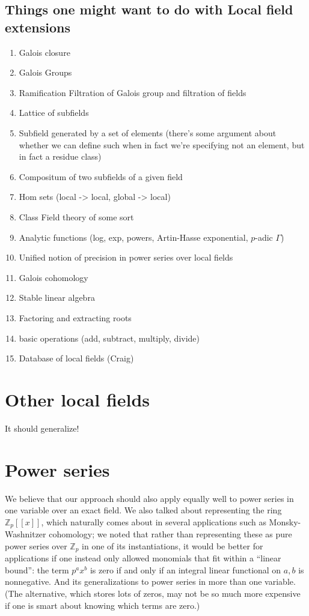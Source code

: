 \documentclass[12pt]{amsart}
\newcommand{\Z}{\mathbb Z}
\begin{document}
\subsection{Things one might want to do with Local field extensions}
\begin{enumerate}
\item Galois closure
\item Galois Groups
\item Ramification Filtration of Galois group and filtration of fields
\item Lattice of subfields
\item Subfield generated by a set of elements (there's some argument about whether we can define such when in fact we're specifying not an element, but in fact a residue class)
\item Compositum of two subfields of a given field
\item Hom sets (local -> local, global -> local)
\item Class Field theory of some sort
\item Analytic functions (log, exp, powers, Artin-Hasse exponential, $p$-adic $\Gamma$)
\item Unified notion of precision in power series over local fields
\item Galois cohomology
\item Stable linear algebra
\item Factoring and extracting roots
\item basic operations (add, subtract, multiply, divide)
\item Database of local fields (Craig)
\end{enumerate}

\section{Other local fields}

It should generalize!

\section{Power series}

We believe that our approach should also apply equally well to power series in one variable over an exact field.  We also talked about representing the ring $\Z_p[[x]]$, which naturally comes about in several applications such as Monsky-Washnitzer cohomology; we noted that rather than representing these as pure power series over $\Z_p$ in one of its instantiations, it would be better for applications if one instead only allowed monomials that fit within a ``linear bound'': the term $p^a x^b$ is zero if and only if an integral linear functional on $a,b$ is nonnegative.  And its generalizations to power series in more than one variable.  (The alternative, which stores lots of zeros, may not be so much more expensive if one is smart about knowing which terms are zero.)
\end{document}
